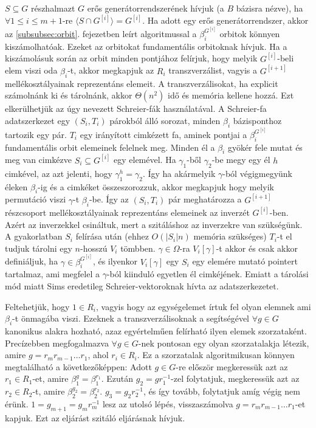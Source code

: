 $S \subseteq G$ részhalmazt $G$ erős generátorrendszerének hívjuk (a $B$ bázisra nézve), ha $\forall 1\le i \le m+1$-re $\langle S \cap G^{[i]} \rangle = G^{[i]}$.
Ha adott egy erős generátorrendszer, akkor az \ref{subsubsec:orbit}. fejezetben leírt algoritmussal a $\beta_i^{G^{[i]}}$ orbitok könnyen kiszámolhatóak.
Ezeket az orbitokat fundamentális orbitoknak hívjuk.
Ha a kiszámolásuk során az orbit minden pontjához felírjuk, hogy melyik $G^{[i]}$-beli elem viszi oda $\beta_i$-t, akkor megkapjuk az $R_i$ transzverzálist,
vagyis a $G^{[i+1]}$ mellékosztályainak reprezentáns elemeit.
A transzverzálisokat, ha explicit számolnánk ki és tárolnánk, akkor $\Theta(n^2)$ idő és memória kellene hozzá.
Ezt elkerülhetjük az úgy nevezett Schreier-fák használatával.
A Schreier-fa adatszerkezet egy $(S_i, T_i)$ párokból álló sorozat, minden $\beta_i$ bázisponthoz tartozik egy pár.
$T_i$ egy irányított cimkézett fa, aminek pontjai a $\beta_i^{G^{[i]}}$ fundamentális orbit elemeinek felelnek meg.
Minden él a $\beta_i$ gyökér fele mutat és meg van cimkézve $S_i \subseteq G^{[i]}$ egy elemével.
Ha $\gamma_1$-ből $\gamma_2$-be megy egy él $h$ cimkével, az azt jelenti, hogy $\gamma_1^h=\gamma_2$.
Így ha akármelyik $\gamma$-ból végigmegyünk éleken $\beta_i$-ig és a cimkéket összeszorozzuk, akkor megkapjuk hogy melyik
permutáció viszi $\gamma$-t $\beta_i$-be. Így az $(S_i, T_i)$ pár meghatározza a $G^{[i+1]}$ részcsoport mellékosztályainak 
reprezentáns elemeinek az inverzét $G^{[i]}$-ben. Azért az inverzekkel csináltuk, mert a szitáláshoz az inverzekre van szükségünk.
A gyakorlatban $S_i$ felírása után (ehhez $O(|S_i|n)$ memória szükséges) $T_i$-t el tudjuk tárolni egy $n$-hosszú $V_i$ tömbben.
$\gamma \in \Omega$-ra $V_i[\gamma]$-t akkor és csak akkor definiáljuk, ha $\gamma \in \beta_i^{G^{[i]}}$,
és ilyenkor $V_i[\gamma]$ egy $S_i$ egy elemére mutató pointert tartalmaz, ami megfelel a $\gamma$-ból kiinduló egyetlen él cimkéjének.
Emiatt a tárolási mód miatt Sims eredetileg Schreier-vektoroknak hívta az adatszerkezetet.

Feltehetjük, hogy $1 \in R_i$, vagyis hogy az egységelemet írtuk fel olyan elemnek ami $\beta_i$-t önmagába viszi.
Ezeknek a transzverzálisoknak a segítségével $\forall g \in G$ kanonikus alakra hozható, azaz egyértelműen felírható ilyen elemek szorzataként.
Precízebben megfogalmazva $\forall g \in G$-nek pontosan egy olyan szorzatalakja létezik, amire $g = r_m r_{m-1} \dots r_1$, ahol $r_i \in R_i$.
Ez a szorzatalak algoritmikusan könnyen megtalálható a következőképpen: Adott $g \in G$-re először megkeressük azt az $r_1 \in R_1$-et, amire $\beta_1^g = \beta_1^{r_1}$.
Ezután $g_2 = g r_1^{-1}$-zel folytatjuk, megkeressük azt az $r_2 \in R_2$-t, amire $\beta_2^{g_2} = \beta_2^{r_2}$. $g_3 = g_2 r_2^{-1}$, és így tovább, folytatjuk amíg végig nem érünk.
$1 = g_{m+1} = g_{m} r_m^{-1}$ lesz az utolsó lépés, visszaszámolva $g = r_m r_{m-1} \dots r_1$-et kapjuk. Ezt az eljárást szitáló eljárásnak hívjuk.

